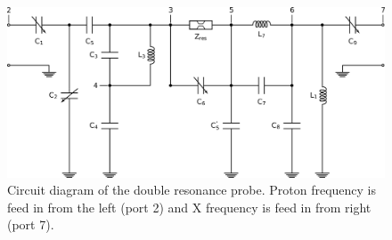 \documentclass[preprint,12pt]{article}
\begin{document}
\begin{figure}
\centering
\includegraphics[width=.7\linewidth,keepaspectratio=true]{./figures/ms5n17-tlp-im-180110-circuit-diagram.png}
\caption{Circuit diagram of the double resonance probe. Proton frequency is feed in from the left (port 2) and X frequency is feed in from right (port 7).}
\label{fig:circuit}
\end{figure}
\end{document}
